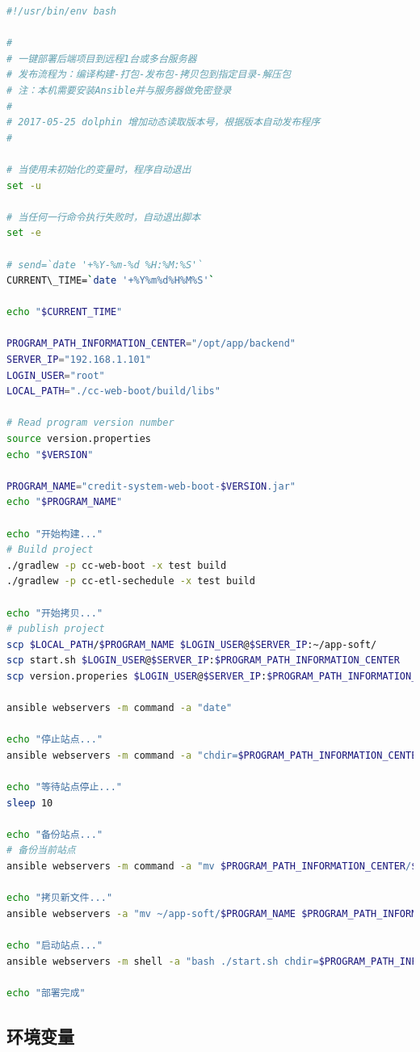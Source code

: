 \documentclass[letter]{book}
\begin{document}
\begin{lstlisting}[language=Bash]
#!/usr/bin/env bash

#
# 一键部署后端项目到远程1台或多台服务器
# 发布流程为：编译构建-打包-发布包-拷贝包到指定目录-解压包
# 注：本机需要安装Ansible并与服务器做免密登录
#
# 2017-05-25 dolphin 增加动态读取版本号，根据版本自动发布程序
#

# 当使用未初始化的变量时，程序自动退出
set -u

# 当任何一行命令执行失败时，自动退出脚本
set -e

# send=`date '+%Y-%m-%d %H:%M:%S'`
CURRENT\_TIME=`date '+%Y%m%d%H%M%S'`

echo "$CURRENT_TIME"

PROGRAM_PATH_INFORMATION_CENTER="/opt/app/backend"
SERVER_IP="192.168.1.101"
LOGIN_USER="root"
LOCAL_PATH="./cc-web-boot/build/libs"

# Read program version number
source version.properties
echo "$VERSION"

PROGRAM_NAME="credit-system-web-boot-$VERSION.jar"
echo "$PROGRAM_NAME"

echo "开始构建..."
# Build project
./gradlew -p cc-web-boot -x test build
./gradlew -p cc-etl-sechedule -x test build

echo "开始拷贝..."
# publish project
scp $LOCAL_PATH/$PROGRAM_NAME $LOGIN_USER@$SERVER_IP:~/app-soft/
scp start.sh $LOGIN_USER@$SERVER_IP:$PROGRAM_PATH_INFORMATION_CENTER
scp version.properies $LOGIN_USER@$SERVER_IP:$PROGRAM_PATH_INFORMATION_CENTER

ansible webservers -m command -a "date"

echo "停止站点..."
ansible webservers -m command -a "chdir=$PROGRAM_PATH_INFORMATION_CENTER bash ./stop.sh"

echo "等待站点停止..."
sleep 10

echo "备份站点..."
# 备份当前站点
ansible webservers -m command -a "mv $PROGRAM_PATH_INFORMATION_CENTER/$PROGRAM_NAME $PROGRAM_PATH_INFORMATION_CENTER/$PROGRAM_NAME-$CURRENT_TIME"

echo "拷贝新文件..."
ansible webservers -a "mv ~/app-soft/$PROGRAM_NAME $PROGRAM_PATH_INFORMATION_CENTER"

echo "启动站点..."
ansible webservers -m shell -a "bash ./start.sh chdir=$PROGRAM_PATH_INFORMATION_CENTER"

echo "部署完成"
\end{lstlisting}

\subsection{环境变量}
\end{document}
